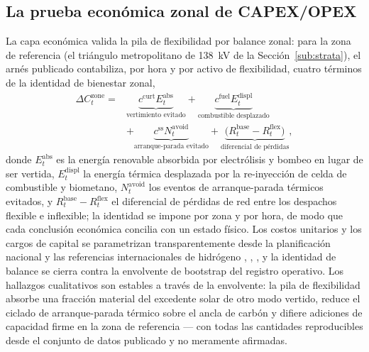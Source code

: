 \subsection{La prueba económica zonal de CAPEX/OPEX}
\label{sub:zonal}

La capa económica valida la pila de flexibilidad por balance zonal: para la zona de referencia (el triángulo metropolitano de 138~kV de la Sección~\ref{sub:strata}), el arnés publicado contabiliza, por hora y por activo de flexibilidad, cuatro términos de la identidad de bienestar zonal,
\begin{equation}
\begin{aligned}
\Delta C^{\mathrm{zone}}_t = {}& \underbrace{c^{\mathrm{curt}} E^{\mathrm{abs}}_t}_{\text{vertimiento evitado}} + \underbrace{c^{\mathrm{fuel}} E^{\mathrm{displ}}_t}_{\text{combustible desplazado}} \\
& + \underbrace{c^{\mathrm{ss}} N^{\mathrm{avoid}}_t}_{\text{arranque-parada evitado}} + \underbrace{\big(R^{\mathrm{base}}_t - R^{\mathrm{flex}}_t\big)}_{\text{diferencial de pérdidas}},
\end{aligned}
\label{eq:zonal}
\end{equation}
donde $E^{\mathrm{abs}}_t$ es la energía renovable absorbida por electrólisis y bombeo en lugar de ser vertida, $E^{\mathrm{displ}}_t$ la energía térmica desplazada por la re-inyección de celda de combustible y biometano, $N^{\mathrm{avoid}}_t$ los eventos de arranque-parada térmicos evitados, y $R^{\mathrm{base}}_t - R^{\mathrm{flex}}_t$ el diferencial de pérdidas de red entre los despachos flexible e inflexible; la identidad se impone por zona y por hora, de modo que cada conclusión económica concilia con un estado físico. Los costos unitarios y los cargos de capital se parametrizan transparentemente desde la planificación nacional y las referencias internacionales de hidrógeno \cite{cne2022}, \cite{irena2020}, \cite{iea2023}, y la identidad de balance se cierra contra la envolvente de bootstrap del registro operativo. Los hallazgos cualitativos son estables a través de la envolvente: la pila de flexibilidad absorbe una fracción material del excedente solar de otro modo vertido, reduce el ciclado de arranque-parada térmico sobre el ancla de carbón y difiere adiciones de capacidad firme en la zona de referencia --- con todas las cantidades reproducibles desde el conjunto de datos publicado y no meramente afirmadas.
